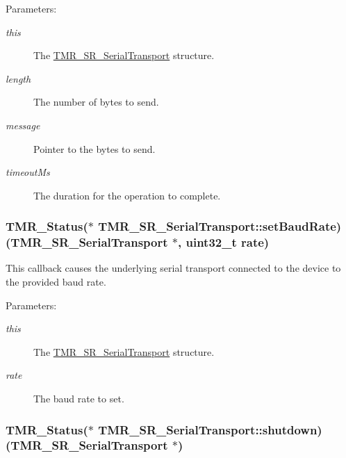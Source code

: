 \begin{Desc}
\item[Parameters:]
\begin{description}
\item[{\em this}]The \hyperlink{struct_t_m_r___s_r___serial_transport}{TMR\_\-SR\_\-SerialTransport} structure. \item[{\em length}]The number of bytes to send. \item[{\em message}]Pointer to the bytes to send. \item[{\em timeoutMs}]The duration for the operation to complete. \end{description}
\end{Desc}
\hypertarget{struct_t_m_r___s_r___serial_transport_fbaedbe9dec17295573159bcaaaebd4c}{
\subsubsection[{setBaudRate}]{\setlength{\rightskip}{0pt plus 5cm}TMR\_\-Status($\ast$ {\bf TMR\_\-SR\_\-SerialTransport::setBaudRate})({\bf TMR\_\-SR\_\-SerialTransport} $\ast$, uint32\_\-t rate)}}
\label{struct_t_m_r___s_r___serial_transport_fbaedbe9dec17295573159bcaaaebd4c}


This callback causes the underlying serial transport connected to the device to the provided baud rate.

\begin{Desc}
\item[Parameters:]
\begin{description}
\item[{\em this}]The \hyperlink{struct_t_m_r___s_r___serial_transport}{TMR\_\-SR\_\-SerialTransport} structure. \item[{\em rate}]The baud rate to set. \end{description}
\end{Desc}
\hypertarget{struct_t_m_r___s_r___serial_transport_bf0146612ec589af32e732200c8fc998}{
\subsubsection[{shutdown}]{\setlength{\rightskip}{0pt plus 5cm}TMR\_\-Status($\ast$ {\bf TMR\_\-SR\_\-SerialTransport::shutdown})({\bf TMR\_\-SR\_\-SerialTransport} $\ast$)}}
\label{struct_t_m_r___s_r___serial_transport_bf0146612ec589af32e732200c8fc998}


